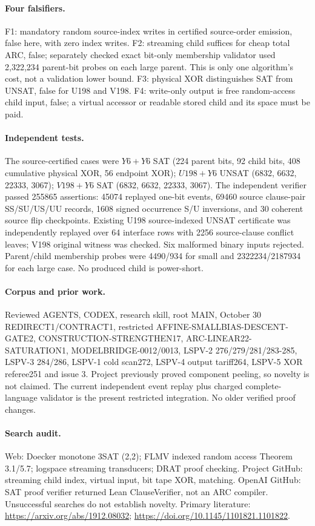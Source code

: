\documentclass{article}
\begin{document}
\paragraph{Four falsifiers.} F1: mandatory random source-index writes in certified source-order emission, false here, with zero index writes. F2: streaming child suffices for cheap total ARC, false; separately checked exact bit-only membership validator used 2,322,234 parent-bit probes on each large parent. This is only one algorithm's cost, not a validation lower bound. F3: physical XOR distinguishes SAT from UNSAT, false for U198 and V198. F4: write-only output is free random-access child input, false; a virtual accessor or readable stored child and its space must be paid.

\paragraph{Independent tests.} The source-certified cases were $Y6+Y6$ SAT (224 parent bits, 92 child bits, 408 cumulative physical XOR, 56 endpoint XOR); $U198+Y6$ UNSAT (6832, 6632, 22333, 3067); $V198+Y6$ SAT (6832, 6632, 22333, 3067). The independent verifier passed 255865 assertions: 45074 replayed one-bit events, 69460 source clause-pair SS/SU/US/UU records, 1608 signed occurrence S/U inversions, and 30 coherent source flip checkpoints. Existing U198 source-indexed UNSAT certificate was independently replayed over 64 interface rows with 2256 source-clause conflict leaves; V198 original witness was checked. Six malformed binary inputs rejected. Parent/child membership probes were 4490/934 for small and 2322234/2187934 for each large case. No produced child is power-short.

\paragraph{Corpus and prior work.} Reviewed AGENTS, CODEX, research skill, root MAIN, October 30 REDIRECT1/CONTRACT1, restricted AFFINE-SMALLBIAS-DESCENT-GATE2, CONSTRUCTION-STRENGTHEN17, ARC-LINEAR22-SATURATION1, MODELBRIDGE-0012/0013, LSPV-2 276/279/281/283-285, LSPV-3 284/286, LSPV-1 cold scan272, LSPV-4 output tariff264, LSPV-5 XOR referee251 and issue 3. Project previously proved component peeling, so novelty is not claimed. The current independent event replay plus charged complete-language validator is the present restricted integration. No older verified proof changes.

\paragraph{Search audit.} Web: Doecker monotone 3SAT (2,2); FLMV indexed random access Theorem 3.1/5.7; logspace streaming transducers; DRAT proof checking. Project GitHub: streaming child index, virtual input, bit tape XOR, matching. OpenAI GitHub: SAT proof verifier returned Lean ClauseVerifier, not an ARC compiler. Unsuccessful searches do not establish novelty. Primary literature: \url{https://arxiv.org/abs/1912.08032}; \url{https://doi.org/10.1145/1101821.1101822}.
\end{document}
